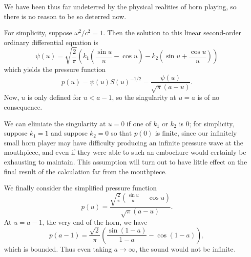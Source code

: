 We have been thus far undeterred by the physical realities of horn playing,
so there is no reason to be so deterred now.

For simplicity, suppose $\omega^2/c^2 = 1$. Then the solution to this linear
second-order ordinary differential equation is
\[
    \psi(u) = \sqrt{\frac{2}{\pi}}
    \left(k_1\left(\frac{\sin u}{u} - \cos u\right)
    - k_2\left(\sin u + \frac{\cos u}{u}\right)\right)
\]
which yields the pressure function
\[
    p(u) = \psi(u)S(u)^{-1/2} = \frac{\psi(u)}{\sqrt{\pi}(a-u)}.
\]
Now, $u$ is only defined for $u < a-1$, so the singularity at $u = a$ is of no consequence.

We can elimiate the singularity at $u = 0$ if one of $k_1$ or $k_2$ is 0;
for simplicity, suppose $k_1 = 1$ and suppose $k_2 = 0$ so that $p(0)$ is finite,
since our infinitely small horn player may have difficulty producing an infinite
pressure wave at the mouthpiece, and even if they were able to such an embochure
would certainly be exhausting to maintain. This assumption will turn out to
have little effect on the final result of the calculation far from the mouthpiece.

We finally consider the simplified pressure function
\[
    p(u) = \frac{\sqrt{\frac{2}{\pi}}\left(\frac{\sin u}{u} - \cos u\right)}
    {\sqrt{\pi}(a-u)}.
\]
At $u = a-1$, the very end of the horn, we have
\[
    p(a-1) = \frac{\sqrt{2}}{\pi}\left(\frac{\sin(1-a)}{1-a} - \cos(1-a)\right),
\]
which is bounded. Thus even taking $a \to \infty$, the sound would not be infinite.


